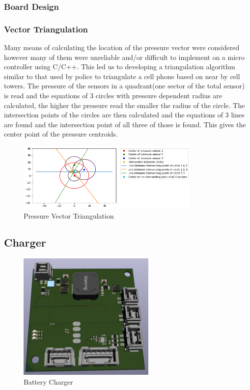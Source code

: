 \subsubsection{Board Design}
\subsubsection{Vector Triangulation}
Many means of calculating the location of the pressure vector were considered however many of them were unreliable and/or difficult to implement on a micro controller using C/C++. This led us to developing a triangulation algorithm similar to that used by police to triangulate a cell phone based on near by cell towers. The pressure of the sensors in a quadrant(one sector of the total sensor) is read and the equations of 3 circles with pressure dependent radius are calculated, the higher the pressure read the smaller the radius of the circle. The intersection points of the circles are then calculated and the equations of 3 lines are found and the intersection point of all three of those is found. This gives the center point of the pressure centroids. 
\begin{figure}[H]
    \centering
    \includegraphics[width=0.8\textwidth]{figures/Triangulation.png}
    \caption{Pressure Vector Triangulation}
    \label{fig:PressureVectorTriangulation}
\end{figure}

\subsection{Charger}
\begin{figure}[H]
       \centering
       \includegraphics[width=0.6\textwidth]{figures/Charger.png}
       \caption{Battery Charger}
       \label{fig:ChargerPCB}
   \end{figure}


